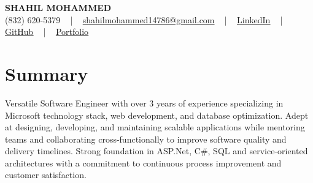 \documentclass[letterpaper,10pt]{article}
\begin{document}
\begin{center}
    {\fontsize{14pt}{12pt}\selectfont \textbf{\MakeUppercase{Shahil Mohammed}}}\\ \vspace{2pt}
    \fontsize{10pt}{12pt}\selectfont (832) 620-5379 ~ | ~ \href{mailto:shahilmohammed14786@gmail.com}{shahilmohammed14786@gmail.com} ~ | ~  
    \href{https://www.linkedin.com/in/shahil-mohammed-9652931a1/}{\color{blue}\underline{LinkedIn}}  ~ | ~ 
    \href{https://github.com/freakbeast14}{\color{blue}\underline{GitHub}} ~ | ~ 
    \href{https://shahil-mohammed.netlify.app/}{\color{blue}\underline{Portfolio}}
    \vspace{-8pt}
\end{center}

\section{Summary}
\vspace{-2pt}\fontsize{8pt}{9pt}\selectfont
Versatile Software Engineer with over 3 years of experience specializing in Microsoft technology stack, web development, and database optimization. Adept at designing, developing, and maintaining scalable applications while mentoring teams and collaborating cross-functionally to improve software quality and delivery timelines. Strong foundation in ASP.Net, C\#, SQL and service-oriented architectures with a commitment to continuous process improvement and customer satisfaction.
 \vspace{-5pt}
 
\vspace{-2pt}
\end{document}

